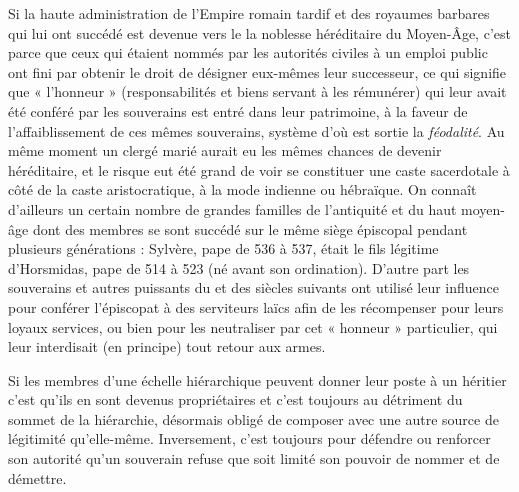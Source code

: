  Si la haute administration de l'Empire romain tardif et des royaumes barbares qui lui ont succédé est devenue vers le  la noblesse héréditaire du Moyen-Âge, c'est parce que ceux qui étaient nommés par les autorités civiles à un emploi public ont fini par obtenir le droit de désigner eux-mêmes leur successeur, ce qui signifie que « l'honneur » (responsabilités et biens servant à les rémunérer) qui leur avait été conféré par les souverains est entré dans leur patrimoine, à la faveur de l'affaiblissement de ces mêmes souverains, système d'où est sortie la \emph{féodalité}. Au même moment un clergé marié aurait eu les mêmes chances de devenir héréditaire, et le risque eut été grand de voir se constituer une caste sacerdotale à côté de la caste aristocratique, à la mode indienne ou hébraïque. On connaît d'ailleurs un certain nombre de grandes familles de l'antiquité et du haut moyen-âge dont des membres se sont succédé sur le même siège épiscopal pendant plusieurs générations : Sylvère, pape de 536 à 537, était le fils légitime d'Horsmidas, pape de 514 à 523 (né avant son ordination). D'autre part les souverains et autres puissants du  et des siècles suivants ont utilisé leur influence pour conférer l'épiscopat à des serviteurs laïcs afin de les récompenser pour leurs loyaux services, ou bien pour les neutraliser par cet « honneur » particulier, qui leur interdisait (en principe) tout retour aux armes. 

 Si les membres d'une échelle hiérarchique peuvent donner leur poste à un héritier c'est qu'ils en sont devenus propriétaires et c'est toujours au détriment du sommet de la hiérarchie, désormais obligé de composer avec une autre source de légitimité qu'elle-même. Inversement, c'est toujours pour défendre ou renforcer son autorité qu'un souverain refuse que soit limité son pouvoir de nommer et de démettre.

